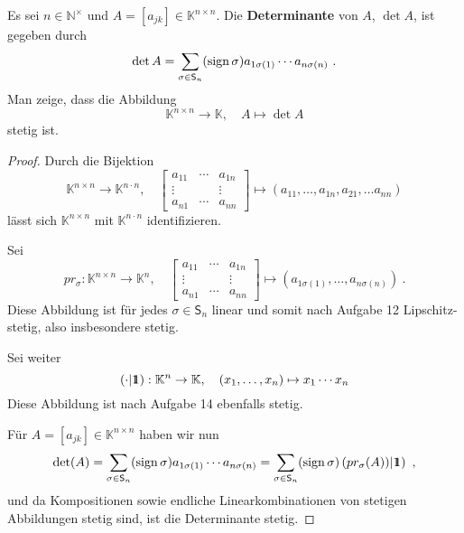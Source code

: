 \setcounter{aufgabe}{15}
\begin{aufgabe}
	Es sei $n \in \mathbb N^\times$ und $A = [a_{jk}] \in \mathbb K^{n \times n}$.
	Die \textbf{Determinante} von $A$, $\det A$, ist gegeben durch
	\[
		\det A = \sum_{\sigma \in \mathsf S_n} (\operatorname{sign} \sigma) a_{1 \sigma(1)} \cdots 
			a_{n \sigma(n)} \ .
	\]
	Man zeige, dass die Abbildung
	\[
		\mathbb K^{n \times n}  \to \mathbb K, \quad A \mapsto \det A
	\]
	stetig ist.
\end{aufgabe}
\begin{proof}
	Durch die Bijektion
	\[
		\mathbb K^{n \times n} \to \mathbb K^{n \cdot n}, \quad
		\begin{bmatrix} a_{11} & \cdots & a_{1n} \\
			\vdots & & \vdots \\
			a_{n1} & \cdots & a_{nn}
		\end{bmatrix}
		\mapsto
		(a_{11}, \ldots, a_{1n}, a_{21}, \ldots a_{nn} )
	\]
	lässt sich $\mathbb K^{n \times n}$ mit $\mathbb K^{n \cdot n}$
	identifizieren.

	Sei
	\[
		pr_\sigma: \mathbb K^{n \times n} \to \mathbb K^n, \quad
		\begin{bmatrix} a_{11} & \cdots & a_{1n} \\
			\vdots & & \vdots \\
			a_{n1} & \cdots & a_{nn}
		\end{bmatrix}
		\mapsto
		(a_{1\sigma(1)}, \ldots, a_{n \sigma(n)}) \ .
	\]
	Diese Abbildung ist für jedes $\sigma \in \mathsf S_n$ linear und somit nach Aufgabe
	12 Lipschitz-stetig, also insbesondere stetig.

	Sei weiter 
	\[
		( \cdot | \bbone ): \mathbb K^n \to \mathbb K, \quad
		(x_1, \ldots, x_n) \mapsto x_1 \cdots x_n
	\]
	Diese Abbildung ist nach Aufgabe 14 ebenfalls stetig.

	Für $A = [a_{jk}] \in \mathbb K^{n \times n}$ haben wir nun
	\[
		\det(A) = \sum_{\sigma \in \mathsf S_n} (\sign \sigma) a_{1 \sigma(1)} \cdots a_{n \sigma(n)}
			= \sum_{ \sigma \in \mathsf S_n} (\sign \sigma) \left( pr_\sigma(A)) | \bbone \right) \ ,
	\]
	und da Kompositionen sowie endliche Linearkombinationen von stetigen Abbildungen stetig sind,
	ist die Determinante stetig.
\end{proof}


